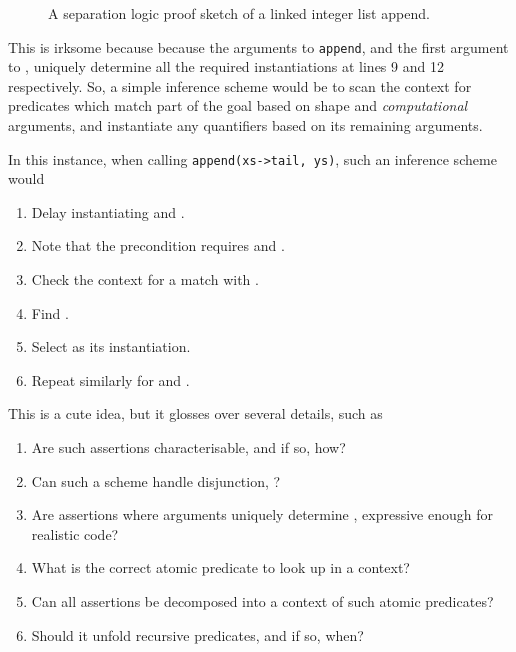 \begin{figure}[h]
    \inputminted[breaklines,linenos,mathescape,fontsize=\small]{py}{code/append_annot.py}
    \caption{A separation logic proof sketch of a linked integer list
        append.}\label{fig:append-annot-formal}
\end{figure}


This is irksome because because the arguments to \texttt{append}, and
the first argument to , uniquely determine all the required
instantiations at lines 9 and 12 respectively. So, a simple inference scheme
would be to scan the context for predicates which match part of the goal based
on shape and \emph{computational} arguments, and instantiate any quantifiers
based on its remaining arguments.

In this instance, when calling \texttt{append(xs->tail, ys)}, %
such an inference scheme would
\begin{enumerate}
    \item Delay instantiating  and .
    \item Note that the precondition requires  and .
    \item Check the context for a match with .
    \item Find .
    \item Select \sm{[l_1' / l_1]} as its instantiation.
    \item Repeat similarly for  and .
\end{enumerate}

This is a cute idea, but it glosses over several details, such as
\begin{enumerate}
    \item Are such assertions characterisable, and if so, how?
    \item Can such a scheme handle disjunction, ?
    \item Are assertions where  arguments uniquely determine
        , expressive enough for realistic code?
    \item What is the correct atomic predicate to look up in a context?
    \item Can all assertions be decomposed into a context of such atomic
        predicates?
    \item Should it unfold recursive predicates, and if so, when?
\end{enumerate}

